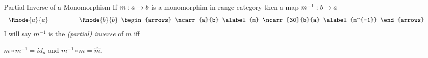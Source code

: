 \begin{frame}{Partial Inverse of a Monomorphism}
If  $m:a \rightarrow b$ is a monomorphim in range category \catcw then
a map $m^{-1}: b \rightarrow a$ 
$$
\begin{array}{c p{1cm} c}
\Rnode{a}{a} && \Rnode{b}{b}
\end{array}
\begin{arrows}
\ncarr{a}{b}
\alabel{m}
\ncarr[30]{b}{a}
\alabel{m^{-1}}
\end{arrows}
$$
I will say $m^{-1}$ is the \textit{(partial) inverse} of $m$ iff
\begin{center}
$m \circ m^{-1}= id_a$
\hspace{0.75cm} and \hspace{0.75cm}
$m^{-1} \circ m= \widehat{m}.$
\end{center} 
\end{frame}
